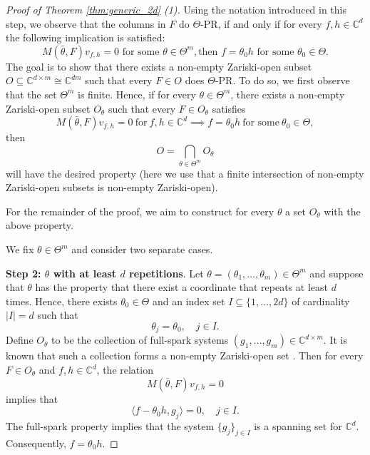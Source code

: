 \documentclass[reqno,a4paper,11pt]{amsart}
\numberwithin{equation}{section}
\def\C{{\mathbb C}}
\newcommand{\Cd}{{\C^d}}
\newcommand\1{\mathds{1}}
\begin{document}
\begin{proof}[Proof of Theorem \ref{thm:generic_2d} (1)]
Using the notation introduced in this step, we observe that the columns in $F$ do $\Theta$-PR, if and only if for every $f,h\in \C^d$ the following implication is satisfied:
\begin{equation}\label{eq:all_theta_implication}
    M(\bar{\theta}, F ) v_{f,h} = 0 \text{ for some }\theta \in \Theta^m, \text{then } f=\theta_0 h \text{ for some } \theta_0\in \Theta.
\end{equation}
The goal is to show that there exists a non-empty Zariski-open subset $O \subseteq \C^{d \times m} \cong \C^{dm}$ such that every $F \in O$ does $\Theta$-PR. To do so, we first observe that the set $\Theta^{m}$ is finite. Hence, if for every $\theta \in \Theta^{m}$, there exists a non-empty Zariski-open subset $O_\theta$ such that every $F \in O_\theta$ satisfies
\begin{equation}\label{eq:fixed_theta_implication}
    M(\bar{\theta}, F ) v_{f,h} = 0 \ \text{for} \ f,h \in \C^d \implies f=\theta_0 h \ \text{for some} \ \theta_0 \in \Theta,
\end{equation}
then
$$
O = \bigcap_{\theta \in \Theta^{m}} O_\theta
$$
will have the desired property (here we use that a finite intersection of non-empty Zariski-open subsets is non-empty Zariski-open).

For the remainder of the proof, we aim to construct for every $\theta$ a set $O_\theta$ with the above property.

We fix $\theta\in\Theta^m$ and consider two separate cases.

\textbf{Step 2: $\theta$ with at least $d$ repetitions}. Let $\theta =(\theta_1,\dots, \theta_m) \in \Theta^m$ and suppose that $\theta$ has the property that there exist a coordinate that repeats at least $d$ times. Hence, there exists $\theta_0 \in \Theta$ and an index set $I \subseteq \{ 1, \dots, 2d \}$ of cardinality $|I|=d$ such that
$$
\theta_j = \theta_0, \quad j \in I.
$$
Define $O_\theta$ to be the collection of full-spark systems $(g_1,\dots, g_m) \in \C^{d \times m}$. It is known that such a collection forms a non-empty Zariski-open set \cite{alexeev2012full}. Then for every $F \in O_\theta$ and $f,h \in \C^d$, the relation
\begin{equation}
    M(\bar{\theta}, F ) v_{f,h} = 0
\end{equation}
implies that
$$
\langle f-\theta_0h, g_j \rangle = 0, \quad j \in I.
$$
The full-spark property implies that the system $\{ g_j \}_{j \in I}$ is a spanning set for $\Cd$. Consequently, $f=\theta_0h$.


\end{proof}
\end{document}
